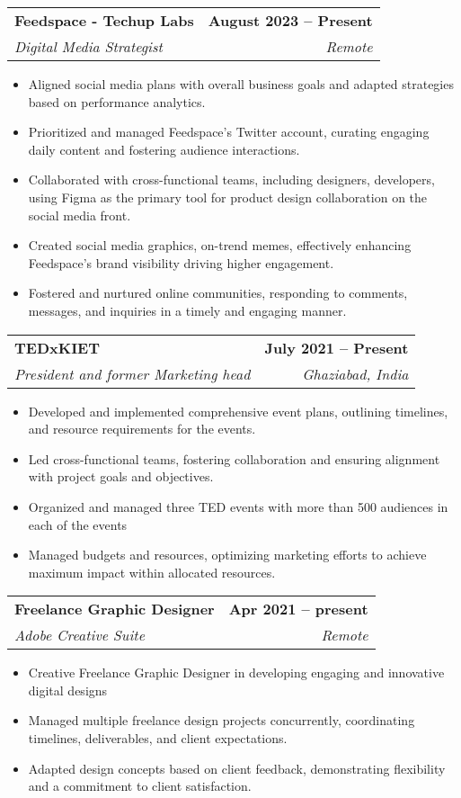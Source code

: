 \documentclass[a4paper,20pt]{article}
\makeatletter
\newcommand{\resumeItem}[1]{
  \item\small{
    {#1 \vspace{-2pt}}
  }
}
\newcommand{\resumeSubheading}[4]{
  \vspace{-2pt}\item
    \begin{tabular*}{1.0\textwidth}[t]{l@{\extracolsep{\fill}}r}
      \textbf{#1} & \textbf{\small #2} \\
      \textit{\small#3} & \textit{\small #4} \\
    \end{tabular*}\vspace{-7pt}
}
\newcommand{\resumeItemListStart}{\begin{itemize}}
\newcommand{\resumeItemListEnd}{\end{itemize}\vspace{-5pt}}
\makeatother
\begin{document}
    \resumeSubheading
      {Feedspace - Techup Labs}{August 2023 -- Present}
      {Digital Media Strategist}{Remote}
      \resumeItemListStart
      \resumeItem{Aligned social media plans with overall business goals and adapted strategies based on performance analytics.}
        \resumeItem{Prioritized and managed Feedspace's Twitter account, curating engaging daily content and fostering audience interactions.}
        \resumeItem{Collaborated with cross-functional teams, including designers, developers, using Figma as the primary tool for product design collaboration on the social media front.}
        \resumeItem{Created social media graphics, on-trend memes, effectively enhancing Feedspace's brand visibility driving higher engagement.}
        \resumeItem{Fostered and nurtured online communities, responding to comments, messages, and inquiries in a timely and engaging manner.}
        
    \resumeItemListEnd
\vspace{-10pt}
    \resumeSubheading
      {TEDxKIET}{July 2021 -- Present}
      {President  and former Marketing head}{Ghaziabad, India}
      \resumeItemListStart
      \resumeItem{Developed and implemented comprehensive event plans, outlining timelines, and resource requirements for the events.}
        \resumeItem{Led cross-functional teams, fostering collaboration and ensuring alignment with project goals and objectives.}
        \resumeItem{Organized and managed three TED events with more than 500 audiences in each of the events}
        \resumeItem{ Managed budgets and resources, optimizing marketing efforts to achieve maximum impact within allocated resources.}
    \resumeItemListEnd
    
    \resumeSubheading
      {Freelance Graphic Designer}{Apr 2021 -- present}
      {Adobe Creative Suite}{Remote}
      \resumeItemListStart
        \resumeItem{Creative Freelance Graphic Designer in developing engaging and innovative digital designs}
        \resumeItem{Managed multiple freelance design projects concurrently, coordinating timelines, deliverables, and client expectations.}
        \resumeItem{Adapted design concepts based on client feedback, demonstrating flexibility and a commitment to client satisfaction.}
    \resumeItemListEnd
    
    
    
\end{document}
